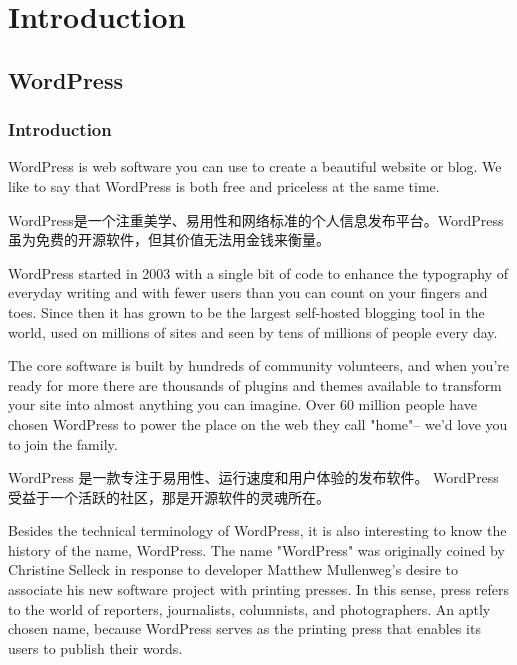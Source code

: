 \part{Introduction}


\chapter{WordPress}

\section{Introduction}

WordPress is web software you can use to create a beautiful website or blog. We like to say that WordPress is both free and priceless at the same time.

WordPress是一个注重美学、易用性和网络标准的个人信息发布平台。WordPress虽为免费的开源软件，但其价值无法用金钱来衡量。





WordPress started in 2003 with a single bit of code to enhance the typography of everyday writing and with fewer users than you can count on your fingers and toes. Since then it has grown to be the largest self-hosted blogging tool in the world, used on millions of sites and seen by tens of millions of people every day.

The core software is built by hundreds of community volunteers, and when you're ready for more there are thousands of plugins and themes available to transform your site into almost anything you can imagine. Over 60 million people have chosen WordPress to power the place on the web they call "home"-- we'd love you to join the family.

WordPress 是一款专注于易用性、运行速度和用户体验的发布软件。 WordPress 受益于一个活跃的社区，那是开源软件的灵魂所在。




Besides the technical terminology of WordPress, it is also interesting to know the history of the name, WordPress. The name "WordPress" was originally coined by Christine Selleck in response to developer Matthew Mullenweg's desire to associate his new software project with printing presses. In this sense, press refers to the world of reporters, journalists, columnists, and photographers. An aptly chosen name, because WordPress serves as the printing press that enables its users to publish their words.

